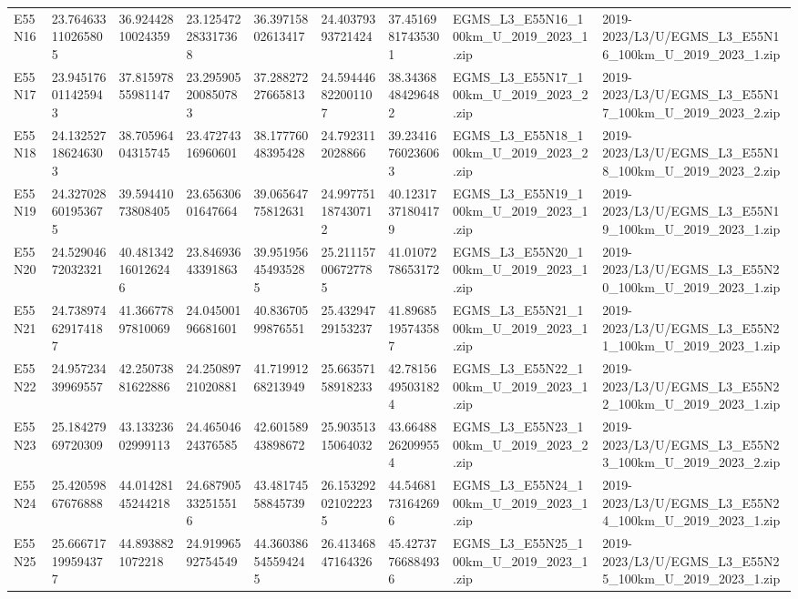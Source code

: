 \begin{landscape}
\begin{longtable}{lllllllll}
E55N16 & 23.764633110265805 & 36.92442810024359 & 23.125472283317368 & 36.39715802613417 & 24.40379393721424 & 37.45169817435301 & EGMS\_L3\_E55N16\_100km\_U\_2019\_2023\_1.zip & 2019-2023/L3/U/EGMS\_L3\_E55N16\_100km\_U\_2019\_2023\_1.zip \\
E55N17 & 23.945176011425943 & 37.81597855981147 & 23.295905200850783 & 37.28827227665813 & 24.594446822001107 & 38.34368484296482 & EGMS\_L3\_E55N17\_100km\_U\_2019\_2023\_2.zip & 2019-2023/L3/U/EGMS\_L3\_E55N17\_100km\_U\_2019\_2023\_2.zip \\
E55N18 & 24.132527186246303 & 38.70596404315745 & 23.47274316960601 & 38.17776048395428 & 24.7923112028866 & 39.23416760236063 & EGMS\_L3\_E55N18\_100km\_U\_2019\_2023\_2.zip & 2019-2023/L3/U/EGMS\_L3\_E55N18\_100km\_U\_2019\_2023\_2.zip \\
E55N19 & 24.327028601953675 & 39.59441073808405 & 23.65630601647664 & 39.06564775812631 & 24.997751187430712 & 40.12317371804179 & EGMS\_L3\_E55N19\_100km\_U\_2019\_2023\_1.zip & 2019-2023/L3/U/EGMS\_L3\_E55N19\_100km\_U\_2019\_2023\_1.zip \\
E55N20 & 24.52904672032321 & 40.481342160126246 & 23.84693643391863 & 39.951956454935285 & 25.211157006727785 & 41.0107278653172 & EGMS\_L3\_E55N20\_100km\_U\_2019\_2023\_1.zip & 2019-2023/L3/U/EGMS\_L3\_E55N20\_100km\_U\_2019\_2023\_1.zip \\
E55N21 & 24.738974629174187 & 41.36677897810069 & 24.04500196681601 & 40.83670599876551 & 25.43294729153237 & 41.89685195743587 & EGMS\_L3\_E55N21\_100km\_U\_2019\_2023\_1.zip & 2019-2023/L3/U/EGMS\_L3\_E55N21\_100km\_U\_2019\_2023\_1.zip \\
E55N22 & 24.95723439969557 & 42.25073881622886 & 24.25089721020881 & 41.71991268213949 & 25.66357158918233 & 42.78156495031824 & EGMS\_L3\_E55N22\_100km\_U\_2019\_2023\_1.zip & 2019-2023/L3/U/EGMS\_L3\_E55N22\_100km\_U\_2019\_2023\_1.zip \\
E55N23 & 25.18427969720309 & 43.13323602999113 & 24.46504624376585 & 42.60158943898672 & 25.90351315064032 & 43.66488262099554 & EGMS\_L3\_E55N23\_100km\_U\_2019\_2023\_2.zip & 2019-2023/L3/U/EGMS\_L3\_E55N23\_100km\_U\_2019\_2023\_2.zip \\
E55N24 & 25.42059867676888 & 44.01428145244218 & 24.687905332515516 & 43.48174558845739 & 26.153292021022235 & 44.54681731642696 & EGMS\_L3\_E55N24\_100km\_U\_2019\_2023\_1.zip & 2019-2023/L3/U/EGMS\_L3\_E55N24\_100km\_U\_2019\_2023\_1.zip \\
E55N25 & 25.666717199594377 & 44.8938821072218 & 24.91996592754549 & 44.360386545594245 & 26.41346847164326 & 45.42737766884936 & EGMS\_L3\_E55N25\_100km\_U\_2019\_2023\_1.zip & 2019-2023/L3/U/EGMS\_L3\_E55N25\_100km\_U\_2019\_2023\_1.zip \\

\end{longtable}
\end{landscape}
